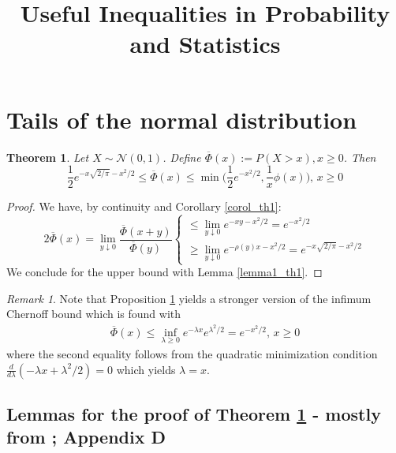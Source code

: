 \documentclass{article}
\theoremstyle{plain}%
\newtheorem{theorem}{Theorem}[section]
\theoremstyle{definition}
\theoremstyle{remark}
\newtheorem{remark}{Remark}
\begin{document}
	
	
\title{Useful Inequalities in Probability and Statistics}

\author{
}

\maketitle

\section{Tails of the normal distribution}

\begin{theorem}  
\label{th1}	
Let $X \sim \mathcal{N}(0,1)$. Define $\overline{\Phi}(x):=P(X>x),x\geq 0$. Then
$$\boxed{\frac{1}{2}e^{-x\sqrt{2/\pi}-x^2/2}\leq \overline{\Phi}(x)\leq \min\bigg(\frac{1}{2}e^{-x^2/2},\frac{1}{x}\phi(x)\bigg),\,x\geq 0}$$
\end{theorem}
\begin{proof} We have, by continuity and Corollary \ref{corol_th1}:
$$2\overline{\Phi}(x)=\lim_{y\downarrow 0}\frac{\overline{\Phi}(x+y)}{\overline{\Phi}(y)}
\begin{cases}
\leq \lim_{y\downarrow 0}e^{-xy-x^2/2}=e^{-x^2/2}\\
\geq \lim_{y\downarrow 0}e^{-\rho(y)x-x^2/2}=e^{-x\sqrt{2/\pi}-x^2/2}
\end{cases}
$$
We conclude for the upper bound with Lemma \ref{lemma1_th1}.
\end{proof}

\begin{remark} Note that Proposition \ref{th1} yields a stronger version of the infimum Chernoff bound which is found with
$$\begin{aligned}\overline{\Phi}(x)\leq \inf_{\lambda \geq 0}e^{-\lambda x}e^{\lambda^2/2}=e^{-x^2/2},\,x\geq 0
\end{aligned}$$
where the second equality follows from the quadratic minimization condition $\frac{d}{d\lambda}(-\lambda x+\lambda^2/2)=0$ which yields $\lambda=x$.
\end{remark}

\subsection{Lemmas for the proof of Theorem \ref{th1} - mostly from \cite{pollard2002user}; Appendix D}
\end{document}
